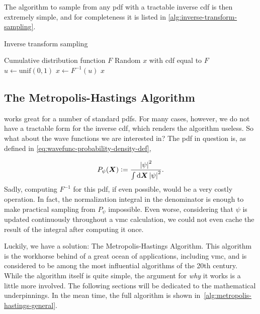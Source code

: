\documentclass[Thesis.tex]{subfiles}
\begin{document}
The algorithm to sample from any \gls{pdf} with a tractable inverse \gls{cdf} is
then extremely simple, and for completeness it is listed in
\cref{alg:inverse-transform-sampling}.

\begin{algorithm}[h]
    \caption{Inverse transform sampling}
    \label{alg:inverse-transform-sampling}
    \begin{algorithmic}[1]
        \Require Cumulative distribution function $F$
        \Ensure Random $x$ with \gls{cdf} equal to $F$
        \Repeat
          \State $u\gets\text{unif}(0,1)$
          \State $x\gets F^{-1}(u)$
          \State \Yield $x$
    \end{algorithmic}
\end{algorithm}

\subsection{The Metropolis-Hastings Algorithm}
\label{sec:metro-hastings-alg}

 works great for a number of standard
\glspl{pdf}. For many cases, however, we do not have a tractable form for the inverse
\gls{cdf}, which renders the algorithm useless. So what about the wave functions we
are interested in? The \gls{pdf} in question is, as defined in \cref{eq:wavefunc-probability-density-def},

\begin{align}
    P_{\psi}(\bm{X}) \vcentcolon= \frac{\abs{\psi}^2}{\int\dd{\bm{X}}\abs{\psi}^2}.
\end{align}
Sadly, computing $F^{-1}$ for this \gls{pdf}, if even possible, would be a very costly
operation. In fact, the normalization integral in the denominator is enough to
make practical sampling from $P_\psi$ impossible. Even worse, considering that
$\psi$ is updated continuously throughout a \gls{vmc} calculation, we could not even
cache the result of the integral after computing it once.

Luckily, we have a solution: The Metropolis-Hastings Algorithm. This algorithm
is the workhorse behind of a great ocean of applications, including \gls{vmc}, and is
considered to be among the most influential algorithms of the 20th century.
While the algorithm itself is quite simple, the argument for \emph{why} it
works is a little more involved. The following sections will be dedicated to the
mathematical underpinnings. In the mean time, the full algorithm is shown
in~\cref{alg:metropolis-hastings-general}.
\end{document}
